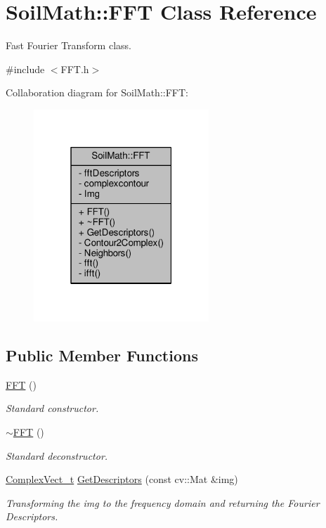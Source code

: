 \hypertarget{class_soil_math_1_1_f_f_t}{}\section{Soil\+Math\+:\+:F\+F\+T Class Reference}
\label{class_soil_math_1_1_f_f_t}


Fast Fourier Transform class.  




{\ttfamily \#include $<$F\+F\+T.\+h$>$}



Collaboration diagram for Soil\+Math\+:\+:F\+F\+T\+:\nopagebreak
\begin{figure}[H]
\begin{center}
\leavevmode
\includegraphics[width=187pt]{class_soil_math_1_1_f_f_t__coll__graph}
\end{center}
\end{figure}
\subsection*{Public Member Functions}
\begin{DoxyCompactItemize}
\item 
\hyperlink{class_soil_math_1_1_f_f_t_a52638bf8f971d1448e46b2b6db5f5e8b}{F\+F\+T} ()
\begin{DoxyCompactList}\small\item\em Standard constructor. \end{DoxyCompactList}\item 
\hyperlink{class_soil_math_1_1_f_f_t_a279862b286d865ebc5aa707f94f19d73}{$\sim$\+F\+F\+T} ()
\begin{DoxyCompactList}\small\item\em Standard deconstructor. \end{DoxyCompactList}\item 
\hyperlink{_soil_math_types_8h_a7567e521c2b2c408dcb62dbff72390f7}{Complex\+Vect\+\_\+t} \hyperlink{class_soil_math_1_1_f_f_t_af5fb6f4804079ee184a314e2f0a0f2fc}{Get\+Descriptors} (const cv\+::\+Mat \&img)
\begin{DoxyCompactList}\small\item\em Transforming the img to the frequency domain and returning the Fourier Descriptors. \end{DoxyCompactList}\end{DoxyCompactItemize}

